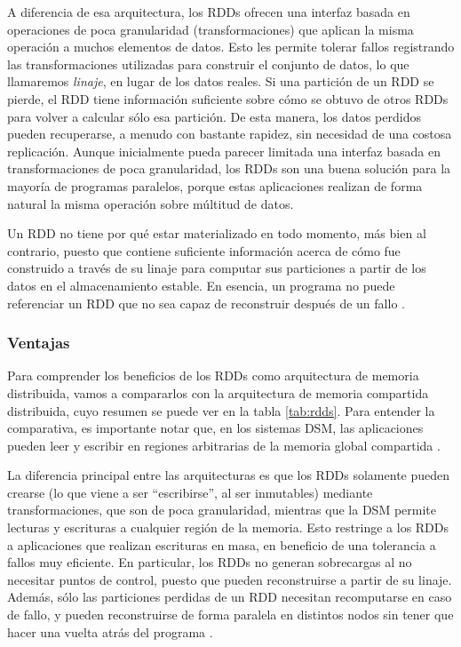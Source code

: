\vspace{10pt}
A diferencia de esa arquitectura, los RDDs ofrecen una interfaz basada en operaciones de poca granularidad 
(transformaciones) que aplican la misma operación a muchos elementos de datos. Esto les permite tolerar fallos 
registrando las transformaciones utilizadas para construir el conjunto de datos, lo que llamaremos \textit{linaje}, en 
lugar de los datos reales. Si una partición de un RDD se pierde, el RDD tiene información suficiente sobre cómo se 
obtuvo de otros RDDs para volver a calcular sólo esa partición. De esta manera, los datos perdidos pueden recuperarse, 
a menudo con bastante rapidez, sin necesidad de una costosa replicación. Aunque inicialmente pueda parecer limitada una 
interfaz basada en transformaciones de poca granularidad, los RDDs son una buena solución para la mayoría de programas 
paralelos, porque estas aplicaciones realizan de forma natural la misma operación sobre múltitud de datos\cite{rdds}.

\vspace{10pt}
Un RDD no tiene por qué estar materializado en todo momento, más bien al contrario, puesto que contiene suficiente
información acerca de cómo fue construido a través de su linaje para computar sus particiones a partir de los datos
en el almacenamiento estable. En esencia, un programa no puede referenciar un RDD que no sea capaz de reconstruir 
después de un fallo \cite{rdds}.

\subsubsection*{Ventajas}

Para comprender los beneficios de los RDDs como arquitectura de memoria distribuida, vamos a compararlos con la 
arquitectura de memoria compartida distribuida, cuyo resumen se puede ver en la tabla \ref{tab:rdds}. Para entender la
comparativa, es importante notar que, en los sistemas DSM, las aplicaciones pueden leer y escribir en regiones 
arbitrarias de la memoria global compartida \cite{rdds}.

\vspace{10pt}
La diferencia principal entre las arquitecturas es que los RDDs solamente pueden crearse (lo que viene a ser 
``escribirse'', al ser inmutables) mediante transformaciones, que son de poca granularidad, mientras que la DSM permite
lecturas y escrituras a cualquier región de la memoria. Esto restringe a los RDDs a aplicaciones que realizan 
escrituras en masa, en beneficio de una tolerancia a fallos muy eficiente. En particular, los RDDs no generan 
sobrecargas al no necesitar puntos de control, puesto que pueden reconstruirse a partir de su linaje. Además, sólo las
particiones perdidas de un RDD necesitan recomputarse en caso de fallo, y pueden reconstruirse de forma paralela en
distintos nodos sin tener que hacer una vuelta atrás del programa \cite{rdds}.

